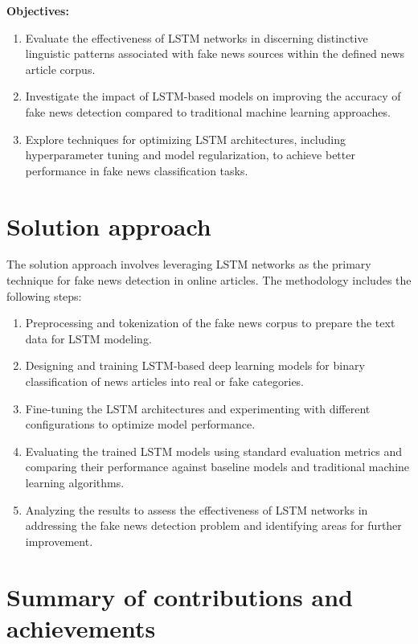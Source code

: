 \textbf{Objectives:} 
\begin{enumerate}
    \item Evaluate the effectiveness of LSTM networks in discerning distinctive linguistic patterns associated with fake news sources within the defined news article corpus.\citep{fake-news} 
    \item Investigate the impact of LSTM-based models on improving the accuracy of fake news detection compared to traditional machine learning approaches. 
    \item Explore techniques for optimizing LSTM architectures, including hyperparameter tuning and model regularization, to achieve better performance in fake news classification tasks. 
\end{enumerate}
 



\section{Solution approach}
\label{sec:intro_sol} %
The solution approach involves leveraging LSTM networks as the primary technique for fake news detection in online articles. The methodology includes the following steps:

\begin{enumerate}
    \item Preprocessing and tokenization of the fake news corpus to prepare the text data for LSTM modeling.
    \item Designing and training LSTM-based deep learning models for binary classification of news articles into real or fake categories.
    \item Fine-tuning the LSTM architectures and experimenting with different configurations to optimize model performance.
    \item Evaluating the trained LSTM models using standard evaluation metrics and comparing their performance against baseline models and traditional machine learning algorithms.
    \item Analyzing the results to assess the effectiveness of LSTM networks in addressing the fake news detection problem and identifying areas for further improvement.
\end{enumerate}
 

\section{Summary of contributions and achievements} %
\label{sec:intro_sum_results} %



